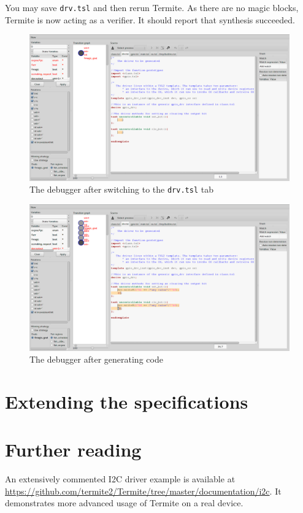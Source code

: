 \documentclass{article}
\newcommand{\code}[1]{\texttt{#1}}
\begin{document}
You may save \code{drv.tsl} and then rerun Termite. As there are no magic blocks, Termite is now acting as a verifier. It should report that synthesis succeeded. 

\begin{figure}
    \center
    \includegraphics[width=\linewidth]{figs/debugger1.png}
    \caption{The debugger after switching to the \code{drv.tsl} tab}
    \label{fig:screenshot_before}
\end{figure}

\begin{figure}
    \center
    \includegraphics[width=\linewidth]{figs/debugger2.png}
    \caption{The debugger after generating code}
    \label{fig:screenshot_after}
\end{figure}

\section{Extending the specifications}
\label{sec:extending}

\section{Further reading}
An extensively commented I2C driver example is available at \url{https://github.com/termite2/Termite/tree/master/documentation/i2c}. It demonstrates more advanced usage of Termite on a real device. 


 
\end{document}
